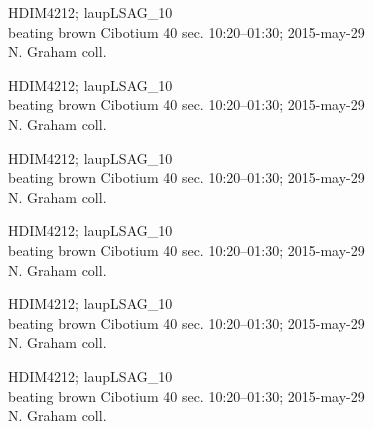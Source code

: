 \documentclass[2pt]{extarticle}
\begin{document}
\noindent
\parbox{0.16\textwidth}{\tiny \raggedright \rule[-0.3\baselineskip]{0pt}{10pt}HDIM4212; laupLSAG\_10\\ beating brown Cibotium 40 sec. 10:20--01:30; 2015-may-29\\ N. Graham coll.}
\parbox{0.16\textwidth}{\tiny \raggedright \rule[-0.3\baselineskip]{0pt}{10pt}HDIM4212; laupLSAG\_10\\ beating brown Cibotium 40 sec. 10:20--01:30; 2015-may-29\\ N. Graham coll.}
\parbox{0.16\textwidth}{\tiny \raggedright \rule[-0.3\baselineskip]{0pt}{10pt}HDIM4212; laupLSAG\_10\\ beating brown Cibotium 40 sec. 10:20--01:30; 2015-may-29\\ N. Graham coll.}
\parbox{0.16\textwidth}{\tiny \raggedright \rule[-0.3\baselineskip]{0pt}{10pt}HDIM4212; laupLSAG\_10\\ beating brown Cibotium 40 sec. 10:20--01:30; 2015-may-29\\ N. Graham coll.}
\parbox{0.16\textwidth}{\tiny \raggedright \rule[-0.3\baselineskip]{0pt}{10pt}HDIM4212; laupLSAG\_10\\ beating brown Cibotium 40 sec. 10:20--01:30; 2015-may-29\\ N. Graham coll.}
\parbox{0.16\textwidth}{\tiny \raggedright \rule[-0.3\baselineskip]{0pt}{10pt}HDIM4212; laupLSAG\_10\\ beating brown Cibotium 40 sec. 10:20--01:30; 2015-may-29\\ N. Graham coll.} \\ 
\vspace{0.001in} 
\end{document}
